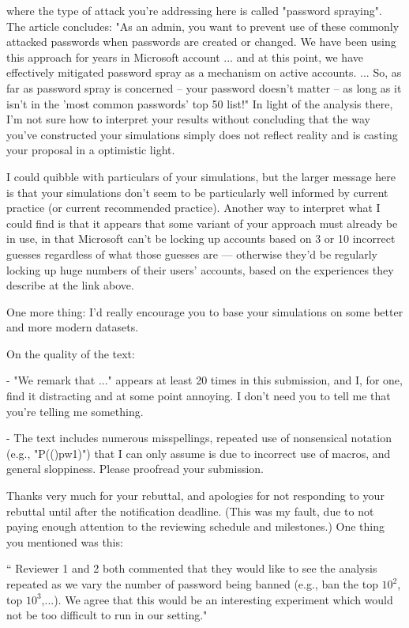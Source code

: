 where the type of attack you're addressing here is called "password
spraying".  The article concludes: "As an admin, you want to prevent
use of these commonly attacked passwords when passwords are created or
changed. We have been using this approach for years in Microsoft
account ... and at this point, we have effectively mitigated password
spray as a mechanism on active accounts.  ... So, as far as password
spray is concerned -- your password doesn’t matter -- as long as it
isn’t in the 'most common passwords' top 50 list!"  In light of the
analysis there, I'm not sure how to interpret your results without
concluding that the way you've constructed your simulations simply
does not reflect reality and is casting your proposal in a optimistic
light.

I could quibble with particulars of your simulations, but the larger
message here is that your simulations don't seem to be particularly
well informed by current practice (or current recommended practice).
Another way to interpret what I could find is that it appears that
some variant of your approach must already be in use, in that
Microsoft can't be locking up accounts based on 3 or 10 incorrect
guesses regardless of what those guesses are --- otherwise they'd be
regularly locking up huge numbers of their users' accounts, based on
the experiences they describe at the link above.

One more thing: I'd really encourage you to base your simulations on
some better and more modern datasets.  

On the quality of the text:

- "We remark that ..." appears at least 20 times in this submission,
  and I, for one, find it distracting and at some point annoying.  I
  don't need you to tell me that you're telling me something.

- The text includes numerous misspellings, repeated use of nonsensical
  notation (e.g., "P(()pw1)") that I can only assume is due to
  incorrect use of macros, and general sloppiness.  Please proofread
  your submission.

Thanks very much for your rebuttal, and apologies for not responding
to your rebuttal until after the notification deadline.  (This was my
fault, due to not paying enough attention to the reviewing schedule
and milestones.)  One thing you mentioned was this:

`` Reviewer 1 and 2 both commented that they would like to see the
   analysis repeated as we vary the number of password being banned
 (e.g., ban the top $10^2$, top $10^3$,...). We agree that this would be
 an interesting experiment which would not be too difficult to run in
 our setting."

